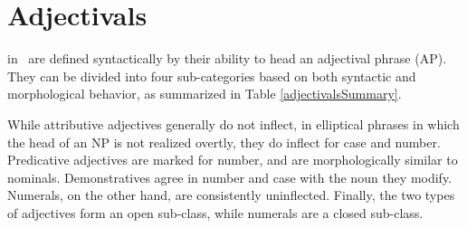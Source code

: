 


\chapter{Adjectivals}\label{adjectivesIntro}%
 in \PS\ are defined syntactically by their ability to head an adjectival phrase (AP). They can be divided into four sub-categories based on both syntactic and morphological behavior, as summarized in Table \vref{adjectivalsSummary}.
\begin{table}\centering
\caption{Summary of syntactic and morphological features for the four types of adjectivals}\label{adjectivalsSummary}
\resizebox{\columnwidth}{!}{
\begin{tabular}{c p{140pt} p{140pt}}%
					&\MC{1}{c}{\It{syntax}}		&\MC{1}{c}{\It{morphology}}	\\\hline
\It{attributive adjectives}	&\HANG attributive position within an NP	&\HANG no inflection (except in elliptic constructions)\\\hline%
\It{predicative adjectives}	&\HANG predicative position (complement of \It{årrot} ‘be’)	&inflect for number\\\hline%
\It{demonstratives}		&\HANG initial attributive position within an NP	&\HANG inflect for number \& case\\\hline%
\It{numerals}			&\HANG attributive or predicative position	& never inflect\\\hline
\end{tabular}}
\end{table}

While attributive adjectives generally do not inflect, in elliptical phrases in which the head of an NP is not realized overtly, they do inflect for case and number. 
Predicative adjectives are marked for number, and are morphologically similar to nominals. 
Demonstratives agree in number and case with the noun they modify. 
Numerals, on the other hand, are consistently uninflected. 
Finally, the two types of adjectives form an open sub-class, while numerals are a closed sub-class. 

